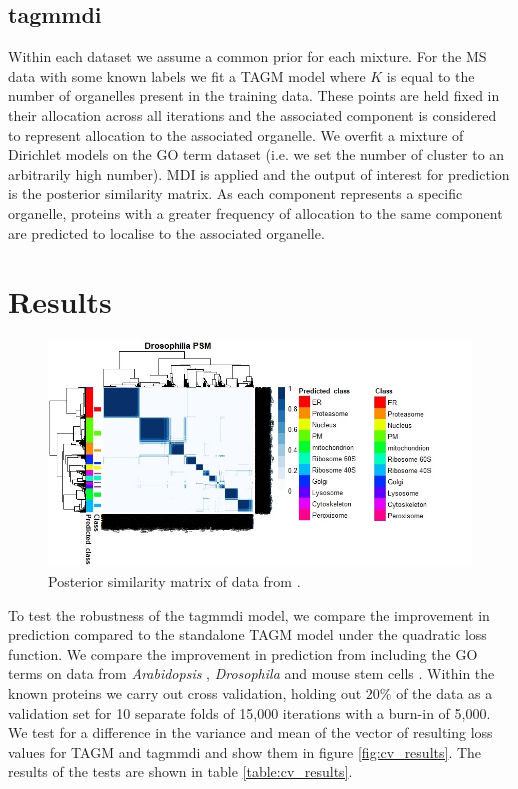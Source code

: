 \documentclass[11pt]{article} %
\begin{document}
\subsection{tagmmdi}
Within each dataset we assume a common prior for each mixture. For the MS data with some known labels we fit a TAGM model where $K$ is equal to the number of organelles present in the training data. These points are held fixed in their allocation across all iterations and the associated component is considered to represent allocation to the associated organelle. We overfit a mixture of Dirichlet models on the GO term dataset (i.e. we set the number of cluster to an arbitrarily high number). MDI is applied and the output of interest for prediction is the posterior similarity matrix. As each component represents a specific organelle, proteins with a greater frequency of allocation to the same component are predicted to localise to the associated organelle.

\section{Results}
\begin{figure}[h]
\centering
\includegraphics[scale=0.9]{tan_psm_edit}
\caption{Posterior similarity matrix of data from \citet{TanMappingOrganelleProteins2009a}.}
\label{fig:tan_psms}
\end{figure}
To test the robustness of the tagmmdi model, we compare the improvement in prediction compared to the standalone TAGM model under the quadratic loss function. We compare the improvement in prediction from including the GO terms on data from \emph{Arabidopsis} \cite{GroenIdentificationTransGolgiNetwork2014a}, \emph{Drosophila}\cite{TanMappingOrganelleProteins2009a} and mouse stem cells \cite{Christoforoudraftmapmouse2016a}. Within the known proteins we carry out cross validation, holding out $20\%$ of the data as a validation set for 10 separate folds of 15,000 iterations with a burn-in of 5,000. We test for a difference in the variance and mean of the vector of resulting loss values for TAGM and tagmmdi and show them in figure \ref{fig:cv_results}. The results of the tests are shown in table \ref{table:cv_results}.
\end{document}
